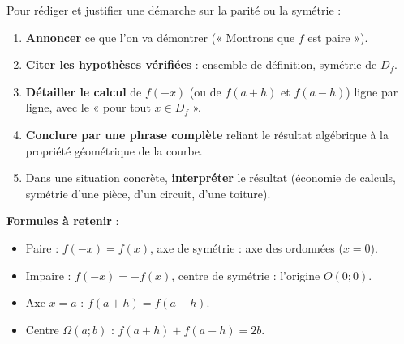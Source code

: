 \documentclass[11pt]{article}
\begin{document}
\begin{methode}
Pour rédiger et justifier une démarche sur la parité ou la symétrie :
\begin{enumerate}
\item \textbf{Annoncer} ce que l'on va démontrer (« Montrons que $f$ est paire »).
\item \textbf{Citer les hypothèses vérifiées} : ensemble de définition, symétrie de $D_f$.
\item \textbf{Détailler le calcul} de $f(-x)$ (ou de $f(a+h)$ et $f(a-h)$) ligne par ligne, avec le « pour tout $x \in D_f$ ».
\item \textbf{Conclure par une phrase complète} reliant le résultat algébrique à la propriété géométrique de la courbe.
\item Dans une situation concrète, \textbf{interpréter} le résultat (économie de calculs, symétrie d'une pièce, d'un circuit, d'une toiture).
\end{enumerate}
\textbf{Formules à retenir} :
\begin{itemize}
\item Paire : $f(-x) = f(x)$, axe de symétrie : axe des ordonnées ($x=0$).
\item Impaire : $f(-x) = -f(x)$, centre de symétrie : l'origine $O(0;0)$.
\item Axe $x = a$ : $f(a+h) = f(a-h)$.
\item Centre $\Omega(a;b)$ : $f(a+h) + f(a-h) = 2b$.
\end{itemize}
\end{methode}
\end{document}
